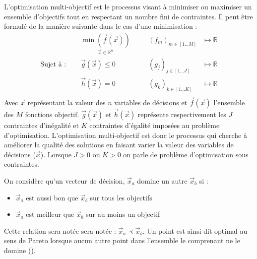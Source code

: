 \begin{Def}\label{def:optimisation_multi_objectif}
L’optimisation multi-objectif est le processus visant à minimiser ou maximiser un ensemble
d’objectifs tout en respectant un nombre fini de contraintes.
Il peut être formulé de la manière suivante dans le cas d’une minimisation :
\begin{equation}\label{eq:def_optimisation}
  \begin{aligned}
                           & \underset{\vec{x} \in \mathbb{R}^{n}}{\min(\vec{f}(\vec{x}))}& & \quad (f_{m})_{m \in [1 ... M]} & \longmapsto \mathbb{R} \\
    \text{Sujet à : }\quad & \vec{g}(\vec{x}) \leqslant 0                                 & & \quad (g_{j})_{j \in [1 ... J]} & \longmapsto \mathbb{R} \\
                           & \vec{h}(\vec{x}) = 0                                         & & \quad (g_{k})_{k \in [1 ... K]} & \longmapsto \mathbb{R} \\
  \end{aligned}
\end{equation}
Avec $\vec{x}$ représentant la valeur des $n$ variables de décisions et $\vec{f}(\vec{x})$
l’ensemble des $M$ fonctions objectif.  $\vec{g}(\vec{x})$ et $\vec{h}(\vec{x})$ représente
respectivement les $J$ contraintes d’inégalité et $K$ contraintes d’égalité imposées au problème
d’optimisation. L’optimisation multi-objectif est donc le processus qui cherche à améliorer la
qualité des solutions en faisant varier la valeur des variables de décisions ($\vec{x}$).
Lorsque $J > 0$ ou $K > 0$ on parle de problème d’optimisation sous contraintes.
\end{Def}

\begin{Def}\label{def:dominance_de_pareto}
On considère qu’un vecteur de décision, $\vec{x}_{a}$ domine un autre $\vec{x}_{b}$ si :
\begin{itemize}
  \item $\vec{x}_{a}$ est aussi bon que $\vec{x}_{b}$ sur tous les objectifs
  \item $\vec{x}_{a}$ est meilleur que $\vec{x}_{b}$ sur au moins un objectif
\end{itemize}
Cette relation sera notée sera notée : $\vec{x}_{a} \prec \vec{x}_{b}$.
Un point est ainsi dit optimal au sens de Pareto lorsque aucun autre point dans
l’ensemble le comprenant ne le domine ().
\end{Def} 

